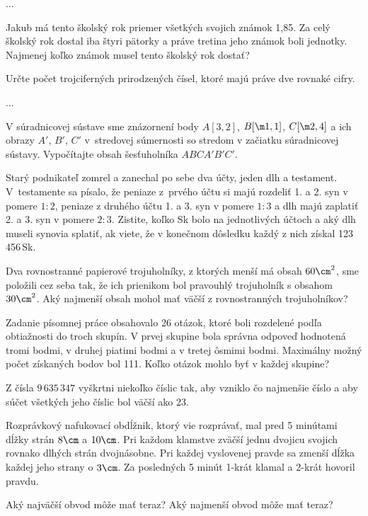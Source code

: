 {%
...}

{%
Jakub má tento školský rok priemer všetkých svojich známok 1,85. Za celý školský rok dostal iba štyri pätorky a práve tretina jeho známok boli jednotky. Najmenej koľko známok musel tento školský rok dostať?}

{%
Určte počet trojciferných prirodzených čísel, ktoré majú práve dve rovnaké cifry.}

{%
...}

{%
V súradnicovej sústave sme znázornení body $A[3,2]$, $B[\m1,1]$, $C[\m2,4]$ a ich obrazy $A'$, $B'$, $C'$ v~stredovej súmernosti so stredom v začiatku súradnicovej sústavy. Vypočítajte obsah šesťuholníka $ABCA'B'C'$.}

{%
Starý podnikateľ zomrel a zanechal po sebe dva účty, jeden dlh a testament. V~testamente sa
písalo, že peniaze z~prvého účtu si majú rozdeliť 1. a 2. syn v pomere $1:2$, peniaze z druhého
účtu 1. a 3. syn v pomere $1:3$ a dlh majú zaplatiť 2. a 3. syn v pomere $2:3$. Zistite, koľko Sk
bolo na jednotlivých účtoch a aký dlh museli synovia splatiť, ak viete, že v konečnom
dôsledku každý z nich získal 123\,456\,Sk.}

{%
Dva rovnostranné papierové trojuholníky, z ktorých menší má obsah $60\cm^2$, sme položili cez
seba tak, že ich prienikom bol pravouhlý trojuholník s obsahom $30\cm^2$. Aký najmenší obsah
mohol mať väčší z rovnostranných trojuholníkov?}

{%
Zadanie písomnej práce obsahovalo 26 otázok, ktoré boli rozdelené podľa obtiažnosti do
troch skupín. V prvej skupine bola správna odpoveď hodnotená tromi bodmi, v druhej piatimi
bodmi a v tretej ôsmimi bodmi. Maximálny možný počet získaných bodov bol 111. Koľko
otázok mohlo byť v každej skupine?}

{%
Z čísla $9\,635\,347$ vyškrtni niekoľko číslic tak, aby vzniklo čo najmenšie číslo a aby súčet všetkých
jeho číslic bol väčší ako $23$.}

{%
Rozprávkový nafukovací obdĺžnik, ktorý vie rozprávať, mal pred 5 minútami dĺžky strán $8\cm$ a $10\cm$. Pri každom klamstve zväčší jednu dvojicu svojich rovnako dlhých strán dvojnásobne. Pri
každej vyslovenej pravde sa zmenší dĺžka každej jeho strany o $3\cm$. Za posledných 5 minút 1-krát
klamal a 2-krát hovoril pravdu.
\begin{itemize}
 Aký najväčší obvod môže mať teraz?
 Aký najmenší obvod môže mať teraz?
\end{itemize}
}

